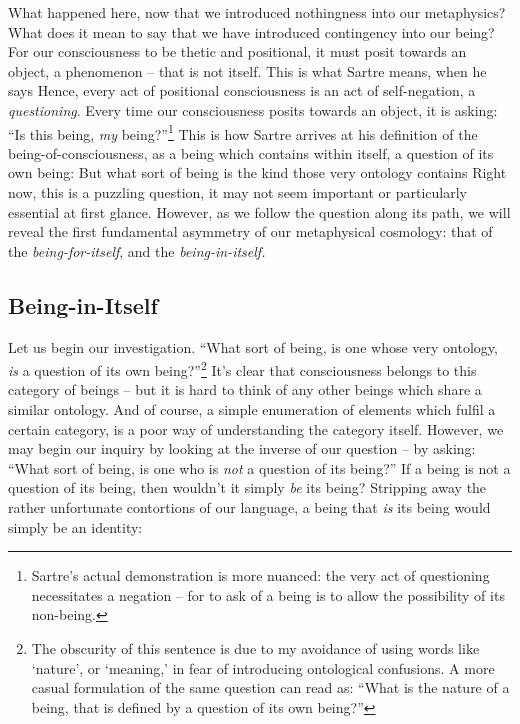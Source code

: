 What happened here, now that we introduced nothingness into our metaphysics? What does it mean to say that we have introduced contingency into our being?  For our consciousness to be thetic and positional, it must posit towards an object, a phenomenon -- that is not itself. This is what Sartre means, when he says  Hence, every act of positional consciousness is an act of self-negation, a \emph{questioning}. Every time our consciousness posits towards an object, it is asking: \enquote{Is this being, \emph{my} being?}\footnote{Sartre's actual demonstration is more nuanced: the very act of questioning necessitates a negation -- for to ask of a being is to allow the possibility of its non-being.} This is how Sartre arrives at his definition of the being-of-consciousness, as a being which contains within itself, a question of its own being:  But what sort of being is the kind those very ontology contains  Right now, this is a puzzling question, it may not seem important or particularly essential at first glance. However, as we follow the question along its path, we will reveal the first fundamental asymmetry of our metaphysical cosmology: that of the \emph{being-for-itself}, and the \emph{being-in-itself.}

\subsection*{Being-in-Itself}

Let us begin our investigation. \enquote{What sort of being, is one whose very ontology, \emph{is} a question of its own being?}\footnote{The obscurity of this sentence is due to my avoidance of using words like \enquote*{nature}, or \enquote*{meaning,} in fear of introducing ontological confusions. A more casual formulation of the same question can read as: \enquote{What is the nature of a being, that is defined by a question of its own being?}} It's clear that consciousness belongs to this category of beings -- but it is hard to think of any other beings which share a similar ontology. And of course, a simple enumeration of elements which fulfil a certain category, is a poor way of understanding the category itself. However, we may begin our inquiry by looking at the inverse of our question -- by asking: \enquote{What sort of being, is one who is \emph{not} a question of its being?} If a being is not a question of its being, then wouldn't it simply \emph{be} its being? Stripping away the rather unfortunate contortions of our language, a being that \emph{is} its being would simply be an identity:

